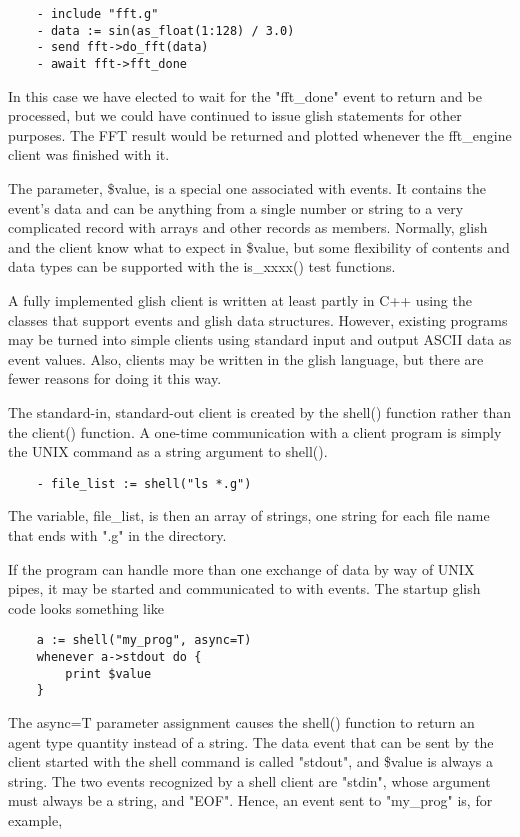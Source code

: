 \begin{verbatim}
	- include "fft.g"
	- data := sin(as_float(1:128) / 3.0)
	- send fft->do_fft(data)
	- await fft->fft_done
\end{verbatim}

    In this case we have elected to wait for the "fft\_done" event to return
and be processed, but we could have continued to issue glish statements for
other purposes.  The FFT result would be returned and plotted whenever the
fft\_engine client was finished with it.

    The parameter, \$value, is a special one associated with events.  It
contains the event's data and can be anything from a single number or
string to a very complicated record with arrays and other records as
members.  Normally, glish and the client know what to expect in \$value, but
some flexibility of contents and data types can be supported with the
is\_xxxx() test functions.

    A fully implemented glish client is written at least partly in C++
using the classes that support events and glish data structures.  However,
existing programs may be turned into simple clients using standard input
and output ASCII data as event values.  Also, clients may be written in the
glish language, but there are fewer reasons for doing it this way.

    The standard-in, standard-out client is created by the shell() function
rather than the client() function.  A one-time communication with a client
program is simply the UNIX command as a string argument to shell().

\begin{verbatim}
	- file_list := shell("ls *.g")
\end{verbatim}

The variable, file\_list, is then an array of strings, one string for each
file name that ends with ".g" in the directory.

    If the program can handle more than one exchange of data by way of UNIX
pipes, it may be started and communicated to with events.  The startup
glish code looks something like

\begin{verbatim}
	a := shell("my_prog", async=T)
	whenever a->stdout do {
	    print $value
	}
\end{verbatim}

The async=T parameter assignment causes the shell() function to return an
agent type quantity instead of a string.  The data event that can be sent
by the client started with the shell command is called "stdout", and \$value
is always a string.  The two events recognized by a shell client are
"stdin", whose argument must always be a string, and "EOF".  Hence, an
event sent to "my\_prog" is, for example,

